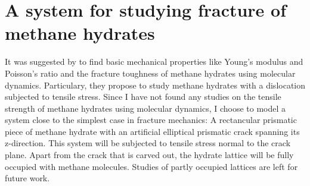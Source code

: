 \section{A system for studying fracture of methane hydrates}
It was suggested by \citet{Ning2012} to find basic mechanical properties like Young's modulus and Poisson's ratio and the fracture toughness of methane hydrates using molecular dynamics. Particulary, they propose to study methane hydrates with a dislocation subjected to tensile stress. Since I have not found any studies on the tensile strength of methane hydrates using molecular dynamics, I choose to model a system close to the simplest case in fracture mechanics: A rectancular prismatic piece of methane hydrate with an artificial elliptical prismatic crack spanning its z-direction. This system will be subjected to tensile stress normal to the crack plane. Apart from the crack that is carved out, the hydrate lattice will be fully occupied with methane molecules. Studies of partly occupied lattices are left for future work.

